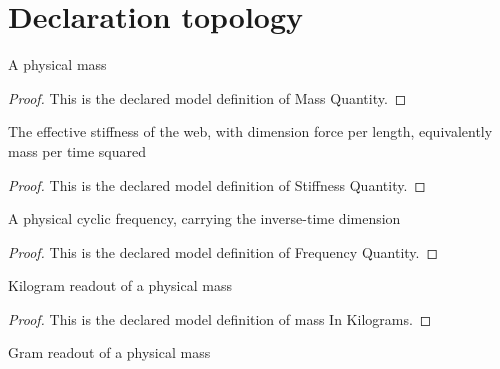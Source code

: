 \section{Declaration topology}
\begin{definition}
  \label{def:physics:phyx-mini-0200:phyxminiproblems-problemphyxmini0200-massquantity}
  A physical mass
\end{definition}
\begin{proof}
  This is the declared model definition of Mass Quantity.
\end{proof}
\begin{definition}
  \label{def:physics:phyx-mini-0200:phyxminiproblems-problemphyxmini0200-stiffnessquantity}
  The effective stiffness of the web, with dimension force per length, equivalently mass per time squared
\end{definition}
\begin{proof}
  This is the declared model definition of Stiffness Quantity.
\end{proof}
\begin{definition}
  \label{def:physics:phyx-mini-0200:phyxminiproblems-problemphyxmini0200-frequencyquantity}
  A physical cyclic frequency, carrying the inverse-time dimension
\end{definition}
\begin{proof}
  This is the declared model definition of Frequency Quantity.
\end{proof}
\begin{definition}
  \label{def:physics:phyx-mini-0200:phyxminiproblems-problemphyxmini0200-massinkilograms}
  Kilogram readout of a physical mass
\end{definition}
\begin{proof}
  This is the declared model definition of mass In Kilograms.
\end{proof}
\begin{definition}
  \label{def:physics:phyx-mini-0200:phyxminiproblems-problemphyxmini0200-massingrams}
  Gram readout of a physical mass
\end{definition}
